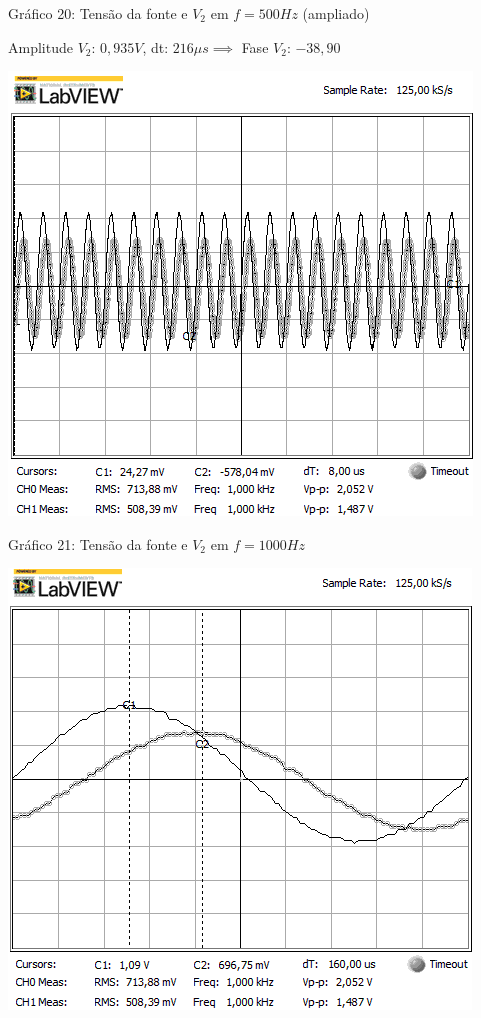 \begin{center}
Gráfico 20: Tensão da fonte e $V_2$ em $f=500Hz$ (ampliado)
\end{center}

Amplitude $V_2$: $0,935V$, dt: $216\mu s\implies$ Fase $V_2$: $-38,90$\textdegree

\newpage
\begin{table}[h]
\centering
\includegraphics[scale=0.725]{rgadicoas/rgadicoa7}
\end{table}

\begin{center}
Gráfico 21: Tensão da fonte e $V_2$ em $f=1000Hz$ 
\end{center}

\begin{table}[h]
\centering
\includegraphics[scale=0.725]{rgadicoas/rgadicoa7-2}
\end{table}

